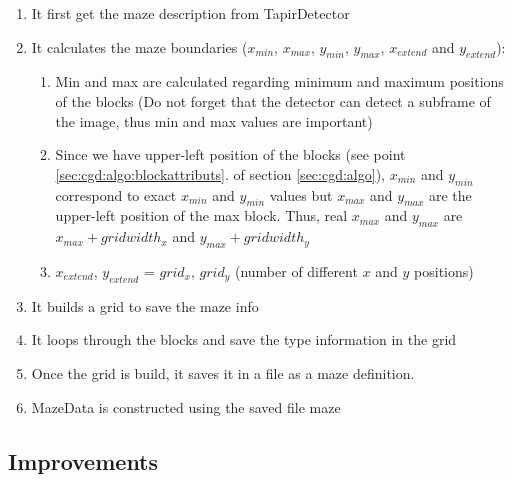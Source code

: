     \begin{enumerate}
        \item It first get the maze description from TapirDetector
        \item It calculates the maze boundaries ($x_{min}$, $x_{max}$, 
            $y_{min}$, $y_{max}$, $x_{extend}$ and $y_{extend}$):
        \begin{enumerate}
            \item Min and max are calculated regarding minimum and maximum 
                positions of the blocks (Do not forget that the detector 
                can detect a subframe of the image, thus min and max 
                values are important)
            \item Since we have upper-left position of the blocks (see
                point \ref{sec:cgd:algo:blockattributs}. of 
                section \ref{sec:cgd:algo}), 
                $x_{min}$ and $y_{min}$ correspond to exact $x_{min}$ 
                and $y_{min}$ values 
                but $x_{max}$ and $y_{max}$ are the upper-left position of the 
                max block. Thus, real $x_{max}$ and $y_{max}$ are 
                $x_{max}+gridwidth_x$ and $y_{max}+gridwidth_y$
            \item $x_{extend}$, $y_{extend}$ = $grid_x$, $grid_y$ 
                (number of different 
                $x$ and $y$ positions)
        \end{enumerate}
        \item It builds a grid to save the maze info
        \item It loops through the blocks and save the type information
            in the grid
        \item Once the grid is build, it saves it in a file as a maze 
            definition. 
        \item MazeData is constructed using the saved file maze
    \end{enumerate}

\subsection{Improvements}
\label{sec:mkd:improvements}

